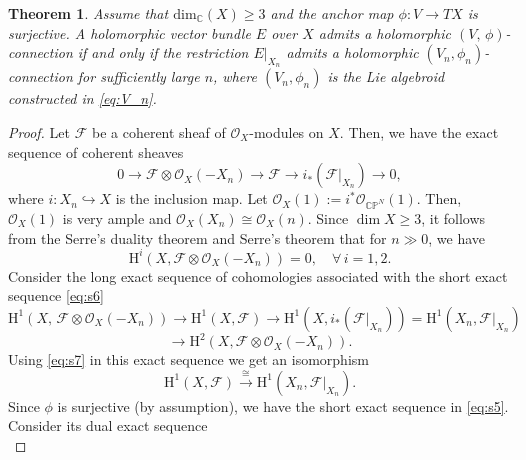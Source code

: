 \documentclass[12pt,reqno]{amsart}
\numberwithin{equation}{section}
\newtheorem{theorem}{Theorem}[section]
\theoremstyle{definition}
\begin{document}
\begin{theorem}\label{thm:main}
Assume that $\mathrm{dim}_{\mathbb{C}} (X)  \geq  3$ and the anchor map $\phi  :  V  \longrightarrow 
TX$ is surjective. A holomorphic vector bundle $E$ over $X$ admits a holomorphic $(V,\,\phi)$-connection if
and only if the restriction $E\big\vert_{X_n}$ admits a holomorphic $(V_n, \phi_n)$-connection
for sufficiently large $n$, where $(V_n, \phi_n)$ is the Lie algebroid constructed in \eqref{eq:V_n}.
\end{theorem}

\begin{proof} 
Let $\mathcal{F}$ be a coherent sheaf of $\mathcal{O}_X$-modules on $X$. Then, we have the exact
sequence of coherent sheaves
\begin{equation} \label{eq:s6}
0 \longrightarrow \mathcal{F} \otimes \mathcal{O}_X(-X_n) \longrightarrow
\mathcal{F} \longrightarrow i_*\left( \mathcal{F}\big\vert_{X_n} \right) \longrightarrow 0,
\end{equation}
where $ i :  X_n  \hookrightarrow   X$ is the inclusion map. Let $\mathcal{O}_X(1)
:= i^* \mathcal{O}_{\mathbb{CP}^N} (1)$. Then, $\mathcal{O}_X(1)$ is very ample and $\mathcal{O}_X(X_n)
 \cong  \mathcal{O}_X(n)$. Since
$\dim X \geq  3$, it follows from the Serre's duality theorem \cite[Theorem 7.6, p.~243]{Ha} and Serre's theorem
\cite[Theorem 5.2, p.~228]{Ha} that for $n  \gg  0$, we have
\begin{equation} \label{eq:s7}
\mathrm{H}^i\left(X,  \mathcal{F} \otimes \mathcal{O}_X(-X_n) \right)  =  0, \quad \forall\,  i  = 1,  2.
\end{equation}
Consider the long exact sequence of cohomologies associated with the short exact sequence
\eqref{eq:s6}
$$
\mathrm{H}^1\left(X,\, \mathcal{F} \otimes \mathcal{O}_X(-X_n) \right) 
 \longrightarrow  \mathrm{H}^1(X,  \mathcal{F})  \longrightarrow
\mathrm{H}^1\left(X,  i_*\left( \mathcal{F}\big\vert_{X_n} \right)\right)  = 
\mathrm{H}^1\left(X_n, \mathcal{F}\big\vert_{X_n}\right)\,$$
$$
\longrightarrow 
\mathrm{H}^2\left(X, \mathcal{F} \otimes \mathcal{O}_X(-X_n) \right).
$$
Using \eqref{eq:s7} in this exact sequence we get an isomorphism
\begin{equation} \label{eq:s8}
\mathrm{H}^1(X, \mathcal{F})  \xrightarrow{\, \cong \,}
\mathrm{H}^1\left(X_n, \mathcal{F}\big\vert_{X_n}\right).
\end{equation}
Since $\phi$ is surjective (by assumption), we have the short exact sequence in \eqref{eq:s5}. Consider
its dual exact sequence
\begin{equation}

\end{equation}
\end{proof}
\end{document}
